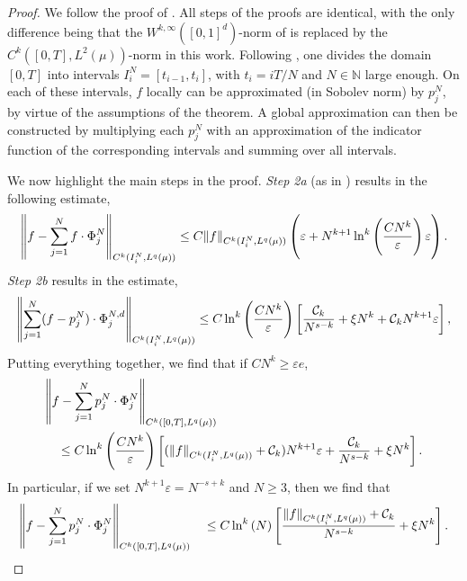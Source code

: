 \documentclass{article}
\numberwithin{equation}{section}
\newcommand{\N}{\mathbb{N}}
\newcommand{\cC}{\mathcal{C}}
\renewcommand{\epsilon}{\varepsilon}
\newcommand{\1}{\mathbbm{1}}
\newcommand{\hki}[1]{\norm{#1}_{C^k(I^N_i, L^q(\mu))}}
\newcommand{\hkunit}[1]{\norm{#1}_{C^k([0,T], L^q(\mu))}}
\begin{document}
\begin{proof}
We follow the proof of \cite[Theorem 5.1]{deryck2021approximation}. All steps of the proofs are identical, with the only difference being that the $W^{k,\infty}([0,1]^d)$-norm of \cite{deryck2021approximation} is replaced by the ${C^k([0,T], L^2(\mu))}$-norm in this work. Following \cite{deryck2021approximation}, one divides the domain $[0,T]$ into intervals $I_i^N = [t_{i-1}, t_i]$, with $t_i=iT/N$ and $N\in\N$ large enough. On each of these intervals, $f$ locally can be  approximated (in Sobolev norm) by $p_j^N$, by virtue of the assumptions of the theorem. A global approximation can then be constructed by multiplying each $p_j^N$ with an approximation of the indicator function of the corresponding intervals and summing over all intervals. 

We now highlight the main steps in the proof. 
\textit{Step 2a} (as in \cite{deryck2021approximation}) results in the following estimate,
\begin{align}
    \begin{split}
        \hki{f-\sum_{j=1}^N f \cdot \Phi^{N}_j} \leq C \hki{f} \left(\epsilon +N^{k+1} \ln^k\left(\frac{CN^k}{\epsilon}\right)\epsilon\right). 
    \end{split}
\end{align}
\textit{Step 2b} results in the estimate, 
\begin{align}
    \begin{split}
       \hki{\sum_{j=1}^N (f -p_j^N)\cdot \Phi^{N,d}_j}\leq  C \ln^k\left(\frac{CN^k}{\epsilon}\right)\left[\frac{\mathcal{C}_k}{N^{s-k}} + \xi N^k + \mathcal{C}_k N^{k+1} {\epsilon}\right],
    \end{split}
\end{align}
Putting everything together, we find that if $CN^k\geq {\epsilon}e$,
\begin{equation}
\begin{split}
    &\hkunit{f-\sum_{j=1}^N p_j^N\cdot \Phi^{N}_j} \\&\quad \leq C \ln^k\left(\frac{CN^k}{\epsilon}\right)\left[(\hki{f}+\cC_k)N^{k+1}\epsilon+ \frac{\mathcal{C}_k}{N^{s-k}} + \xi N^k\right]. 
\end{split}
\end{equation}
In particular, if we set $N^{k+1}\epsilon = N^{-s+k}$ and $N\geq 3$, then we find that
\begin{equation}
\begin{split}
    \hkunit{f-\sum_{j=1}^N p_j^N\cdot \Phi^{N}_j} \quad \leq C \ln^k\left(N\right)\left[\frac{\hki{f}+\mathcal{C}_k}{N^{s-k}} + \xi N^k\right]. 
\end{split}
\end{equation}
\end{proof}
\end{document}
